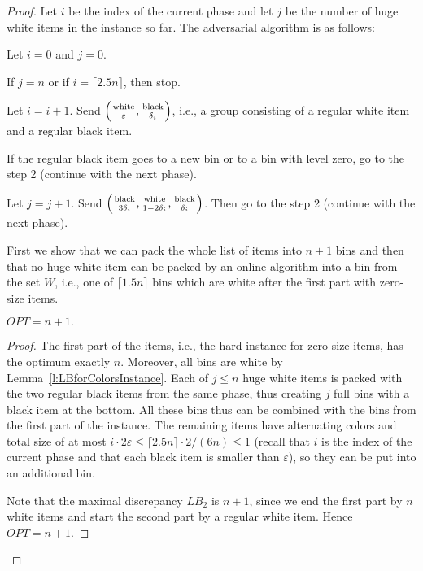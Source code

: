 \documentclass[11pt,a4paper]{article}
\def\vari#1{\mathit{#1}}
\newcommand*{\nolinefrac}[2]{\genfrac{}{}{0pt}{1}{#1}{#2}}
\begin{document}
\begin{proof}
Let $i$ be the index of the current phase and let $j$ be the number of huge white items
in the instance so far. The adversarial algorithm is as follows:
\begin{compactenum}
\item Let $i = 0$ and $j = 0$.
\item If $j = n$ or if $i = \lceil 2.5n\rceil$, then stop.
\item Let $i = i + 1$. Send $\left(\nolinefrac{\mathrm{white}}{\varepsilon}, \nolinefrac{\mathrm{black}}{\delta_i}\right)$, i.e., a group consisting
of a regular white item and a regular black item.
\item If the regular black item goes to a new bin or to a bin with level zero, go to the step 2
(continue with the next phase).
\item Let $j = j + 1$. Send
$\left(\nolinefrac{\mathrm{black}}{3\delta_i}, \nolinefrac{\mathrm{white}}{1 - 2\delta_i}, \nolinefrac{\mathrm{black}}{\delta_i}\right)$.
Then go to the step 2 (continue with the next phase).
\end{compactenum}

First we show that we can pack the whole list of items into $n + 1$ bins and then that no huge white item
can be packed by an online algorithm into a bin from the set $W$, i.e., one of $\lceil 1.5n \rceil$ bins which are white after the first part
with zero-size items.

\begin{lemma}
$\vari{OPT} = n + 1.$
\end{lemma}

\begin{proof}
The first part of the items, i.e., the hard instance for zero-size items, has the optimum exactly $n$.
Moreover, all bins are white by Lemma~\ref{l:LBforColorsInstance}.
Each of $j \leq n$ huge white items is packed with the two regular black items from the same phase,
thus creating $j$ full bins with a black item at the bottom.
All these bins thus can be combined with the bins from the first part of the instance.
The remaining items have alternating colors and total size of at most
$i \cdot 2\varepsilon \leq \lceil 2.5n\rceil \cdot 2/(6n) \leq 1$
(recall that $i$ is the index of the current phase and that each black item is smaller than $\varepsilon$),
so they can be put into an additional bin.

Note that the maximal discrepancy $\vari{LB}_2$ is $n + 1$, since we end the first part by $n$ white items and 
start the second part by a regular white item. Hence $\vari{OPT} = n + 1$.
\end{proof}


\end{proof}
\end{document}
